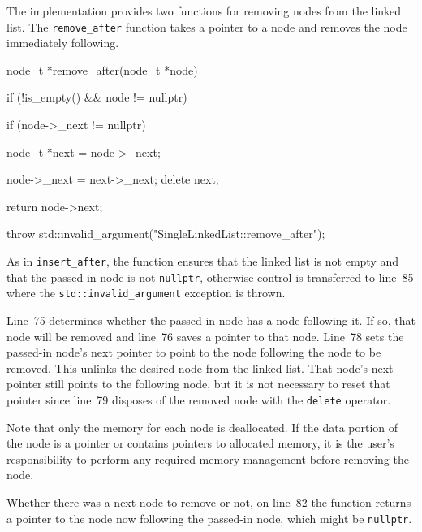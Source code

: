 \documentclass{article}
\begin{document}
  The implementation provides two functions for removing nodes from the linked list. The \verb|remove_after| function takes a pointer to a node and removes the node immediately following.
  \begin{lstcpp}
  node_t *remove_after(node_t *node) {
    if (!is_empty() && node != nullptr) {
      if (node->_next != nullptr) {
        node_t *next = node->_next;

        node->_next = next->_next;
        delete next;
      }

      return node->next;
    }

    throw std::invalid_argument("SingleLinkedList::remove_after");
  }\end{lstcpp}
  As in \verb|insert_after|, the function ensures that the linked list is not empty and that the passed-in node is not \verb|nullptr|, otherwise control is transferred to line~85 where the \verb|std::invalid_argument| exception is thrown.

  Line~75 determines whether the passed-in node has a node following it. If so, that node will be removed and line~76 saves a pointer to that node. Line~78 sets the passed-in node's next pointer to point to the node following the node to be removed. This unlinks the desired node from the linked list. That node's next pointer still points to the following node, but it is not necessary to reset that pointer since line~79 disposes of the removed node with the \verb|delete| operator.

  Note that only the memory for each node is deallocated. If the data portion of the node is a pointer or contains pointers to allocated memory, it is the user’s responsibility to perform any required memory management before removing the node.

  Whether there was a next node to remove or not, on line~82 the function
  returns a pointer to the node now following the passed-in node, which might be
  \verb|nullptr|.
\end{document}
